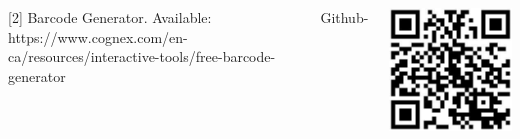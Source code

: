 \documentclass[20pt,margin=1in,innermargin=-4.5in,blockverticalspace=-0.25in]{tikzposter}
\begin{document}
\begin{columns}
{         
         
         
         [2]\textbf{ }Barcode Generator. Available: https://www.cognex.com/en-ca/resources/interactive-tools/free-barcode-generator
         \vspace{1cm}
         
         
         
         Github-
         \begin{tikzfigure}
            \includegraphics[width=0.5\linewidth]{Barcode.jpg}
        \end{tikzfigure}
         
        
    }
\end{columns}
\end{document}
